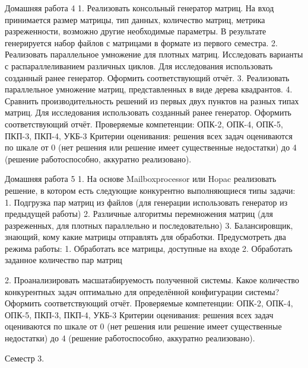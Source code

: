 Домашняя работа 4 
    1. Реализовать консольный генератор матриц. На вход принимается размер матрицы, тип данных, количество матриц, метрика разреженности, возможно другие необходимые параметры. В результате генерируется набор файлов с матрицами в формате из первого семестра. 
    2. Реализовать параллельное умножение для плотных матриц. Исследовать варианты с распараллеливанием различных циклов. Для исследования использовать созданный ранее генератор. Оформить соответствующий отчёт.
    3. Реализовать параллельное умножение матриц, представленных в виде дерева квадрантов.
    4. Сравнить производительность решений из первых двух пунктов на разных типах матриц. Для исследования использовать созданный ранее генератор. Оформить соответствующий отчёт. 
Проверяемые компетенции: ОПК-2, ОПК-4, ОПК-5, ПКП-3, ПКП-4, УКБ-3
Критерии оценивания: решения всех задач оцениваются по шкале от 0 (нет решения или решение имеет существенные недостатки) до 4 (решение работоспособно, аккуратно реализовано).

Домашняя работа 5
    1. На основе Mailboxprocessor или Hopac реализовать решение, в котором есть следующие конкурентно выполняющиеся типы задачи: 
        1. Подгрузка пар матриц из файлов (для генерации использовать генератор из предыдущей работы)
        2. Различные алгоритмы перемножения матриц (для разреженных, для плотных параллельно и последовательно)
        3. Балансировщик, знающий, кому какие матрицы отправлять для обработки.
Предусмотреть два режима работы: 
            1. Обработать все матрицы, доступные на входе
            2. Обработать заданное количество пар матриц
    
    2. Проанализировать масшатабируемость полученной системы. Какое количество конкурентных задач оптимально для определённой конфигурации системы? Оформить соответствующий отчёт.
Проверяемые компетенции: ОПК-2, ОПК-4, ОПК-5, ПКП-3, ПКП-4, УКБ-3
Критерии оценивания: решения всех задач оцениваются по шкале от 0 (нет решения или решение имеет существенные недостатки) до 4 (решение работоспособно, аккуратно реализовано).

Семестр 3.

